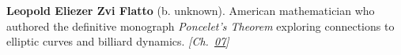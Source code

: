 \textbf{Leopold Eliezer Zvi Flatto} (b. unknown). American mathematician who authored the definitive monograph \emph{Poncelet's Theorem} exploring connections to elliptic curves and billiard dynamics. \emph{[Ch.~\hyperref[ch:billiardsconicsporism]{07}]}

